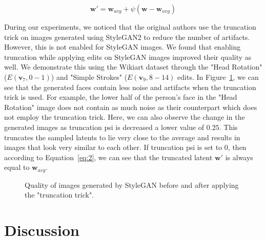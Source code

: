 \begin{equation}
    \mathbf{w'} = \mathbf{w}_{avg} + \psi (\mathbf{w} - \mathbf{w}_{avg})
    \label{eq:2}
\end{equation}

During our experiments, we noticed that the original authors use the truncation trick on images generated using StyleGAN2 to reduce the number of artifacts. However, this is not enabled for StyleGAN images. We found that enabling truncation while applying edits on StyleGAN images improved their quality as well. We demonstrate this using the Wikiart dataset through the "Head Rotation" ($E(\textbf{v}_{7}, 0-1)$) and "Simple Strokes" ($E(\textbf{v}_{9}, 8-14)$ edits. In Figure~\ref{fig:truncation_psi}, we can see that the generated faces contain less noise and artifacts when the truncation trick is used. For example, the lower half of the person's face in the "Head Rotation" image does not contain as much noise as their counterpart which does not employ the truncation trick. Here, we can also observe the change in the generated images as truncation psi is decreased a lower value of $0.25$. This truncates the sampled latents to lie very close to the average and results in images that look very similar to each other. If truncation psi is set to $0$, then according to Equation~\ref{eq:2}, we can see that the truncated latent $\textbf{w}'$ is always equal to $\textbf{w}_{avg}$.

\begin{figure}




\caption{Quality of images generated by StyleGAN before and after applying the "truncation trick".}
\label{fig:truncation_psi}
\end{figure}

\section{Discussion}

